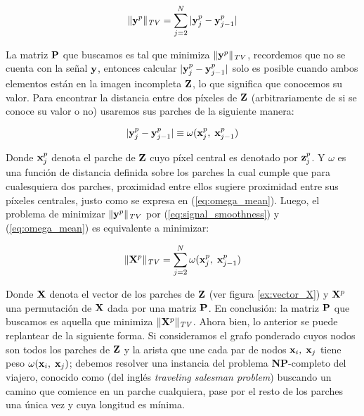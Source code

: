 \begin{equation}
	\|\y^p\|_{\mathit{TV}} = \sum_{j = 2}^{N}|\y_j^{p} - \y_{j - 1}^{p}|
	\label{eq:signal_smoothness}
\end{equation}

La matriz $\P$ que buscamos es tal que minimiza $\|\y^p\|_{\mathit{TV}}$, recordemos que no se cuenta con la señal  $\y$, entonces calcular $|\y_j^{p} - \y_{j - 1}^{p}|$ solo es posible cuando ambos elementos est\'an en la imagen incompleta $\Z$, lo que significa que conocemos su valor. Para encontrar la distancia entre dos p\'ixeles de $\Z$ (arbitrariamente de si se conoce su valor o no) usaremos sus parches de la siguiente manera:

\begin{equation}
	|\y_j^{p} - \y_{j - 1}^{p}| \equiv \omega(\x_j^p,\; \x_{j - 1}^p)
	\label{eq:omega_mean}
\end{equation}

Donde $\x_j^p$ denota el parche de $\Z$ cuyo p\'ixel central es denotado por $\z_j^p$. Y $\omega$ es una funci\'on de distancia definida sobre los parches la cual cumple que para cualesquiera dos parches, proximidad entre ellos sugiere proximidad entre sus p\'ixeles centrales, justo como se expresa en (\ref{eq:omega_mean}). Luego, el problema de minimizar $\|\y^p\|_{\mathit{TV}}$ por (\ref{eq:signal_smoothness}) y (\ref{eq:omega_mean}) es equivalente a minimizar:

\begin{equation}
	\|\X^p\|_{\mathit{TV}} = \sum_{j = 2}^{N}\omega(\x_j^{p},\; \x_{j - 1}^{p})
	\label{eq:path_smoothness}
\end{equation}

Donde $\X$ denota el vector de los parches de $\Z$ (ver figura \ref{ex:vector_X}) y $\X^p$ una permutaci\'on de $\X$ dada por una matriz $\P$. En conclusi\'on: la matriz $\P$ que buscamos es aquella  que minimiza $\|\X^p\|_{\mathit{TV}}$. Ahora bien, lo anterior se puede replantear de la siguiente forma. Si consideramos el grafo ponderado cuyos nodos son todos los parches de $\Z$ y la arista que une cada par de nodos $\x_i,\;\x_j$ tiene peso $\omega(\x_i,\; \x_j)$; debemos resolver una instancia del problema \textbf{NP}-completo del viajero, conocido como \TSP \cite{cormen2009introduction,enwiki:tsp} (del ingl\'es \textit{traveling salesman problem}) buscando un camino que comience en un parche cualquiera, pase por el resto de los parches una \'unica vez y cuya longitud es m\'inima.

